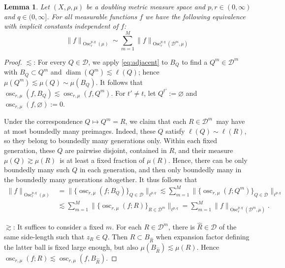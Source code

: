 \documentclass[reqno]{amsart}
\newcommand{\Norm}[2]{\|#1\|_{#2}}
\newcommand{\BNorm}[2]{\Big\|#1\Big\|_{#2}}
\theoremstyle{plain}
\newtheorem{lemma}[equation]{Lemma}
\theoremstyle{definition}
\theoremstyle{remark}
\begin{document}
\begin{lemma}\label{lem:Osc=Osc(D)}
Let $(X,\rho,\mu)$ be a doubling metric measure space and $p,r\in(0,\infty)$ and $q\in(0,\infty]$.
For all measurable functions $f$ we have the following equivalence with implicit constants independent of $f$:
\begin{equation*}
  \Norm{f}{\operatorname{Osc}^{p,q}_r(\mu)}
  \sim\sum_{m=1}^M \Norm{f}{\operatorname{Osc}^{p,q}_r(\mathscr D^m,\mu)}
\end{equation*}
\end{lemma}

\begin{proof}
$\lesssim$: For every $Q\in \mathscr D$, we apply \eqref{eq:adjacent} to $B_Q$ to find a $Q^m\in\mathscr D^m$ with $B_Q\subset Q^m$ and $\operatorname{diam}(Q^m)\lesssim\ell(Q)$; hence $\mu(Q^m)\lesssim\mu(Q)\sim\mu(B_Q)$.
It follows that $\operatorname{osc}_{r,\mu}(f,B_Q)\lesssim\operatorname{osc}_{r,\mu}(f,Q^m)$. For $t'\neq t$, let $Q^{t'}:=\varnothing$ and $\operatorname{osc}_{r,\mu}(f,\varnothing):=0$.

Under the correspondence $Q\mapsto Q^m=R$, we claim that each $R\in\mathscr D^m$ may have at most boundedly many preimages. Indeed, these $Q$ satisfy $\ell(Q)\sim\ell(R)$, so they belong to boundedly many generations only. Within each fixed generation, these $Q$ are pairwise disjoint, contained in $R$, and their measure $\mu(Q)\gtrsim\mu(R)$ is at least a fixed fraction of $\mu(R)$. Hence, there can be only boundedly many such $Q$ in each generation, and then only boundedly many in the boundedly many generations altogether. It thus follows that
\begin{equation*}
\begin{split}
  \Norm{f}{\operatorname{Osc}^{p,q}_r(\mu)}
  &=\BNorm{\Big\{\operatorname{osc}_{r,\mu}(f;B_Q)\Big\}_{Q\in\mathscr D}}{\ell^{p,q}}
  \lesssim\sum_{m=1}^M \BNorm{\Big\{\operatorname{osc}_{r,\mu}(f;Q^m)\Big\}_{Q\in\mathscr D}}{\ell^{p,q}} \\
  &\lesssim\sum_{m=1}^M \BNorm{\Big\{\operatorname{osc}_{r,\mu}(f;R)\Big\}_{R\in\mathscr D^m}}{\ell^{p,q}}
  =\sum_{m=1}^M \Norm{f}{\operatorname{Osc}^{p,q}_r(\mathscr D^m,\mu)}.
\end{split}
\end{equation*}

$\gtrsim$: It suffices to consider a fixed $m$. For each $R\in\mathscr D^m$, there is $\hat R\in\mathscr D$ of the same side-length such that $z_R\in Q$. Then $R\subset B_{\hat R}$ when expansion factor defining the latter ball is fixed large enough, but also $\mu(B_{\hat R})\lesssim\mu(R)$. Hence $\operatorname{osc}_{r,\mu}(f;R)\lesssim\operatorname{osc}_{r,\mu}(f,B_{\hat R})$.


\end{proof}
\end{document}
